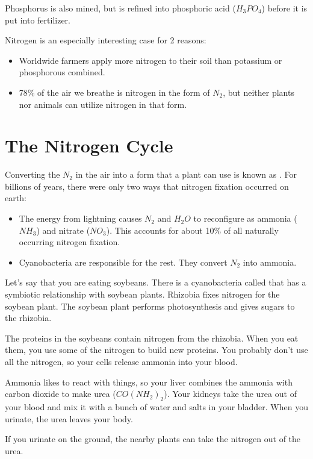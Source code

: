 Phosphorus is also mined, but is refined into phosphoric acid
($H_3PO_4$) before it is put into fertilizer.

Nitrogen is an especially interesting case for 2 reasons:
\begin{itemize}
\item Worldwide farmers apply more nitrogen to their soil than potassium or phosphorous combined.
\item 78\% of the air we breathe is nitrogen in the form of $N_2$, but
  neither plants nor animals can utilize nitrogen in that form.
\end{itemize}

\section{The Nitrogen Cycle}

Converting the $N_2$ in the air into a form that a plant can use
is known as . For billions of years, there
were only two ways that nitrogen fixation occurred on earth:
\begin{itemize}
\item The energy from lightning causes $N_2$ and $H_2O$ to reconfigure as ammonia ($NH_3$) and nitrate ($NO_3$). This accounts for about 10\% of all naturally occurring nitrogen fixation.
\item Cyanobacteria are responsible for the rest. They convert $N_2$ into ammonia.
\end{itemize} 

Let's say that you are eating soybeans. There is a cyanobacteria
called  that has a symbiotic relationship with
soybean plants.  Rhizobia fixes nitrogen for the soybean plant. The
soybean plant performs photosynthesis and gives sugars to the
rhizobia.

The proteins in the soybeans contain nitrogen from the rhizobia. When
you eat them, you use some of the nitrogen to build new proteins. You
probably don't use all the nitrogen, so your cells release ammonia into your blood.

Ammonia likes to react with things, so your liver combines the ammonia
with carbon dioxide to make urea ($CO(NH_2)_2$).  Your kidneys take
the urea out of your blood and mix it with a bunch of water and salts
in your bladder.  When you urinate, the urea leaves your body.

If you urinate on the ground, the nearby plants can take the nitrogen out of
the urea.

